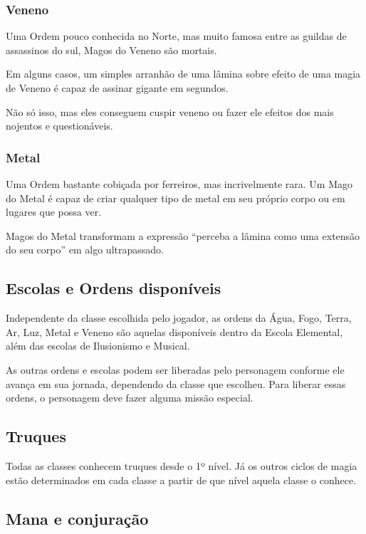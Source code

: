 \documentclass{RPG_Adventure}[2021/10/20]
\begin{document}
\subsubsection*{Veneno}%
\label{ssub:veneno}

Uma Ordem pouco conhecida no Norte, mas muito famosa entre as guildas de
assassinos do sul, Magos do Veneno são mortais.

Em alguns casos, um simples arranhão de uma lâmina sobre efeito de uma magia de
Veneno é capaz de assinar gigante em segundos.

Não só isso, mas eles conseguem cuspir veneno ou fazer ele efeitos dos mais
nojentos e questionáveis.

\subsubsection*{Metal}%
\label{ssub:metal}

Uma Ordem bastante cobiçada por ferreiros, mas incrivelmente rara. Um Mago do
Metal é capaz de criar qualquer tipo de metal em seu próprio corpo ou em lugares
que possa ver.

Magos do Metal transformam a expressão ``perceba a lâmina como uma extensão do
seu corpo'' em algo ultrapassado.

\subsection*{Escolas e Ordens disponíveis}%
\label{sub:escolas_e_ordens_disponiveis}

Independente da classe escolhida pelo jogador, as ordens da Água, Fogo, Terra,
Ar, Luz, Metal e Veneno são aquelas disponíveis dentro da Escola Elemental, além
das escolas de Ilusionismo e Musical.

As outras ordens e escolas podem ser liberadas pelo personagem conforme ele
avança em sua jornada, dependendo da classe que escolheu. Para liberar essas
ordens, o personagem deve fazer alguma missão especial.

\subsection*{Truques}%
\label{sub:truques}

Todas as classes conhecem truques desde o 1º nível. Já os outros ciclos de magia
estão determinados em cada classe a partir de que nível aquela classe o conhece.

\subsection*{Mana e conjuração}%
\label{sub:mana_e_conjuracao}
\end{document}
